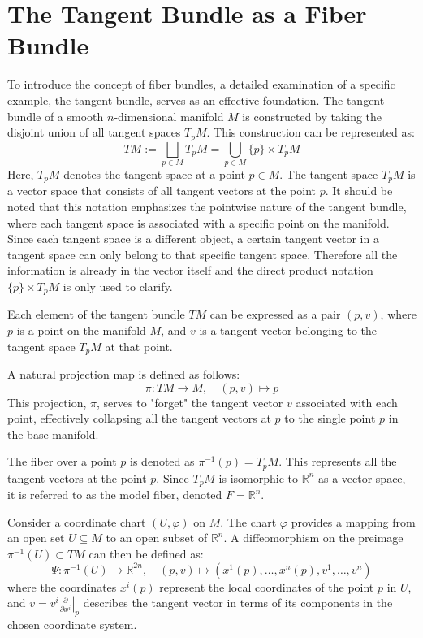 \section{The Tangent Bundle as a Fiber Bundle}

To introduce the concept of fiber bundles, a detailed examination of a specific example, the tangent bundle, serves as an effective foundation.
The tangent bundle of a smooth \( n \)-dimensional manifold \( M \) is constructed by taking the disjoint union of all tangent spaces \( T_pM \). This construction can be represented as:
\[
TM := \bigsqcup_{p \in M} T_pM = \bigcup_{p \in M} \{p\} \times T_pM
\]
Here, \( T_pM \) denotes the tangent space at a point \( p \in M \). The tangent space \( T_pM \) is a vector space that consists of all tangent vectors at the point \( p \). It should be noted that this notation emphasizes the pointwise nature of the tangent bundle, where each tangent space is associated with a specific point on the manifold. Since each tangent space is a different object, a certain tangent vector in a tangent space can only belong to that specific tangent space. Therefore all the information is already in the vector itself and the direct product notation \( \{p\} \times T_pM \) is only used to clarify\cite{FredericSchullerTopologicalmanifoldsmanifoldbundlesLec06FredericSchuller2015}.

Each element of the tangent bundle \( TM \) can be expressed as a pair \( (p, v) \), where \( p \) is a point on the manifold \( M \), and \( v \) is a tangent vector belonging to the tangent space \( T_pM \) at that point. 

A natural projection map is defined as follows:
\[
\pi: TM \to M, \quad (p, v) \mapsto p
\]
This projection, \( \pi \), serves to "forget" the tangent vector \( v \) associated with each point, effectively collapsing all the tangent vectors at \( p \) to the single point \( p \) in the base manifold\cite{NakaharaGeometrytopologyphysics2005}.

The fiber over a point \( p \) is denoted as \( \pi^{-1}(p) = T_pM \). This represents all the tangent vectors at the point \( p \). Since \( T_pM \) is isomorphic to \( \mathbb{R}^n \) as a vector space, it is referred to as the model fiber, denoted \( F = \mathbb{R}^n \)\cite{NakaharaGeometrytopologyphysics2005}.

Consider a coordinate chart \( (U, \varphi) \) on \( M \). The chart \( \varphi \) provides a mapping from an open set \( U \subseteq M \) to an open subset of \( \mathbb{R}^n \). A diffeomorphism on the preimage \( \pi^{-1}(U) \subset TM \) can then be defined as:
\[
\Psi: \pi^{-1}(U) \to \mathbb{R}^{2n}, \quad (p, v) \mapsto \left(x^1(p), \dots, x^n(p), v^1, \dots, v^n \right)
\]
where the coordinates \( x^i(p) \) represent the local coordinates of the point \( p \) in \( U \), and \( v = v^i \left. \frac{\partial}{\partial x^i} \right|_p \) describes the tangent vector in terms of its components in the chosen coordinate system\cite{NakaharaGeometrytopologyphysics2005}.


